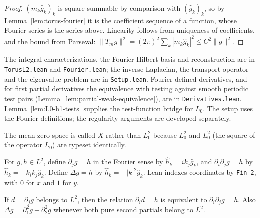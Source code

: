 \begin{proof}
\leanok
$(m_k\hat g_k)_k$ is square summable by comparison with $(\hat g_k)_k$, so by
Lemma~\ref{lem:torus-fourier} it is the coefficient sequence of a function,
whose Fourier series is the series above. Linearity follows from uniqueness of
coefficients, and the bound from Parseval:
$\|T_mg\|^2=(2\pi)^2\sum_k|m_k\hat g_k|^2\le C^2\|g\|^2$.
\end{proof}

\begin{remark}
The integral characterizations, the Fourier Hilbert basis and reconstruction
are in \texttt{TorusL2.lean} and \texttt{Fourier.lean}; the inverse
Laplacian, the transport operator and the eigenvalue problem are in
\texttt{Setup.lean}. Fourier-defined derivatives, and for first partial
derivatives the equivalence with testing against smooth periodic test pairs
(Lemma~\ref{lem:partial-weak-equivalence}), are in \texttt{Derivatives.lean}.
Lemma~\ref{lem:L0-h1-tests} supplies the test-function bridge for $L_0$.
The setup uses the Fourier definitions; the regularity arguments are
developed separately.
\end{remark}

\begin{remark}
The mean-zero space is called $X$ rather than $L^2_0$ because $L^2_0$ and
$L_0^2$ (the square of the operator $L_0$) are typeset identically.
\end{remark}

\begin{definition}
\label{def:fourier-derivatives}
\leanok
For $g,h\in L^2$, define $\partial_jg=h$ in the Fourier sense by
$\hat h_k=ik_j\hat g_k$, and $\partial_i\partial_jg=h$ by
$\hat h_k=-k_i k_j\hat g_k$.
Define $\Delta g=h$ by $\hat h_k=-|k|^2\hat g_k$.
Lean indexes coordinates by \texttt{Fin 2}, with $0$ for $x$ and $1$ for $y$.
\end{definition}

\begin{lemma}
\label{lem:fourier-derivative-composition}
\leanok
If $d=\partial_jg$ belongs to $L^2$, then the relation
$\partial_i d=h$ is equivalent to $\partial_i\partial_jg=h$.
Also $\Delta g=\partial_1^2g+\partial_2^2g$ whenever both pure second
partials belong to $L^2$.
\end{lemma}


